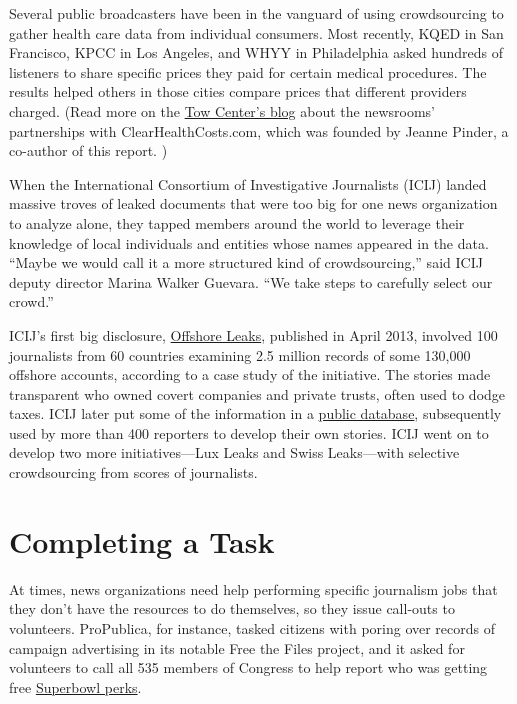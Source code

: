 \documentclass[notoc, symmetric, nobib, nols]{towcenter-guideto-book}
\begin{document}
Several public broadcasters have been in the vanguard of using crowdsourcing to gather health care data from individual consumers. Most recently, KQED in San Francisco, KPCC in Los Angeles, and WHYY in Philadelphia asked hundreds of listeners to share specific prices they paid for certain medical procedures. The results helped others in those cities compare prices that different providers charged.%
(Read more on the \href{http://towcenter.org/crowdsourcing-in-theory-and-practice}{Tow Center's blog} about the newsrooms' partnerships with ClearHealthCosts.com, which was founded by Jeanne Pinder, a co-author of this report.%
)

When the International Consortium of Investigative Journalists (ICIJ) landed massive troves of leaked documents that were too big for one news organization to analyze alone, they tapped members around the world to leverage their knowledge of local individuals and entities whose names appeared in the data. ``Maybe we would call it a more structured kind of crowdsourcing,” said ICIJ deputy director Marina Walker Guevara. “We take steps to carefully select our crowd.''%

ICIJ's first big disclosure, \href{http://www.icij.org/offshore}{Offshore Leaks}, published in April 2013, involved 100 journalists from 60 countries examining 2.5 million records of some 130,000 offshore accounts, according to a case study of the initiative.\autocite{Buzenberg} The stories made transparent who owned covert companies and private trusts, often used to dodge taxes. ICIJ later put some of the information in a \href{http://www.icij.org/offshore/search-offshore-leaks-data}{public database}, subsequently used by more than 400 reporters to develop their own stories.%
 ICIJ went on to develop two more initiatives---Lux Leaks and Swiss Leaks---with selective crowdsourcing from scores of journalists.\autocite{Buzenberg} 


\section{Completing a Task}

At times, news organizations need help performing specific journalism jobs that they don't have the resources to do themselves, so they issue call-outs to volunteers. ProPublica, for instance, tasked citizens with poring over records of campaign advertising in its notable Free the Files project, and it asked for volunteers to call all 535 members of Congress to help report who was getting free \href{http://www.propublica.org/getinvolved/item/propublicas-super-bowl-blitz-which-congressmen-are-getting-super-bowl-perks}{Superbowl perks}.\autocite{perks}
\end{document}
